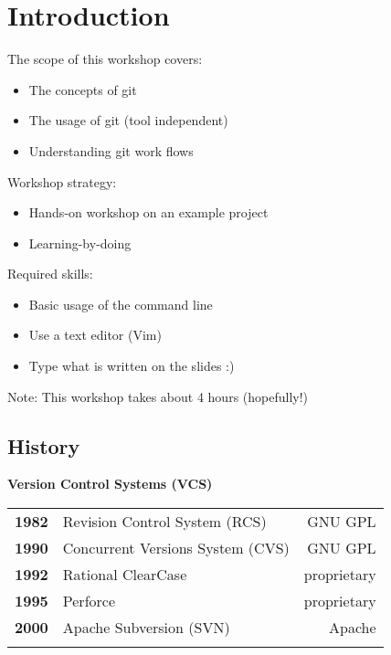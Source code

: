 \section{Introduction}
\begin{frame}
  \slidetitle
  The scope of this workshop covers:
  \begin{itemize}
    \item The concepts of git
    \item The usage of git (tool independent)
    \item Understanding git work flows
  \end{itemize}

  \pause
  \vspace{1em}
  Workshop strategy:
  \begin{itemize}
    \item Hands-on workshop on an example project
    \item Learning-by-doing
  \end{itemize}

  \pause
  \vspace{1em}
  Required skills:
  \begin{itemize}
    \item Basic usage of the command line
    \item Use a text editor (Vim)
    \item Type what is written on the slides :)
  \end{itemize}

  \vspace{1em}
  Note: This workshop takes about 4 hours (hopefully!)
\end{frame}

\subsection{History}
\begin{frame}
  \subslidetitle

  \textbf{Version Control Systems (VCS)}
  \pause
  \\
  \begin{tabular}{lp{5cm}r}
    \textbf{1982} & Revision Control System (RCS) & GNU GPL \\
    \pause
    \textbf{1990} & Concurrent Versions System (CVS) & GNU GPL \\
    \pause
    \textbf{1992} & Rational ClearCase & proprietary \\
    \pause
    \textbf{1995} & Perforce  & proprietary \\
    \pause
    \textbf{2000} & Apache Subversion (SVN)  & Apache \\
    \pause
  \end{tabular}
\end{frame}

